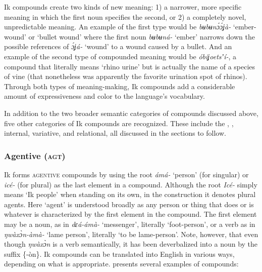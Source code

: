 Ik compounds create two kinds of new meaning: 1) a narrower, more specific meaning in which the first noun specifies the second, or 2) a completely novel, unpredictable meaning. An example of the first type would be \textit{bʉbʉn\'{ɔ}\'{ɔ}ʝà-} ‘ember-wound’ or ‘bullet wound’ where the first noun \textit{bʉbʉná-} ‘ember’ narrows down the possible references of \textit{\'{ɔ}ʝá-} ‘wound’ to a wound caused by a bullet. And an example of the second type of compounded meaning would be \textit{óbiʝoetsʼí-}, a compound that literally means ‘rhino urine’ but is actually the name of a species of vine (that nonetheless was apparently the favorite urination spot of rhinos). Through both types of meaning-making, Ik compounds add a considerable amount of expressiveness and color to the language’s vocabulary.

In addition to the two broader semantic categories of compounds discussed above, five other categories of Ik compounds are recognized. These include the , , internal, variative, and relational, all discussed in the sections to follow.


\subsubsection{Agentive (\textsc{agt})}\label{sec:4.3.1}
Ik forms \textsc{agentive} compounds by using the root \textit{ámá-} ‘person’ (for singular) or \textit{icé-} (for plural) as the last element in a compound. Although the root \textit{Icé-} simply means ‘Ik people’ when standing on its own, in the  construction it denotes plural agents. Here ‘agent’ is understood broadly as any person or thing that does or is whatever is characterized by the first element in the compound. The first element may be a noun, as in \textit{dɛá-ámà-} ‘messenger’, literally ‘foot-person’, or a verb as in \textit{ŋwàx\`{ɔ}n{\Ì}-àmà-} ‘lame person’, literally ‘to be lame-person’. Note, however, that even though \textit{ŋwàx\`{ɔ}n} is a verb semantically, it has been deverbalized into a noun by the  suffix \{-òn\}. Ik  compounds can be translated into English in various ways, depending on what is appropriate.  presents several examples of  compounds:



